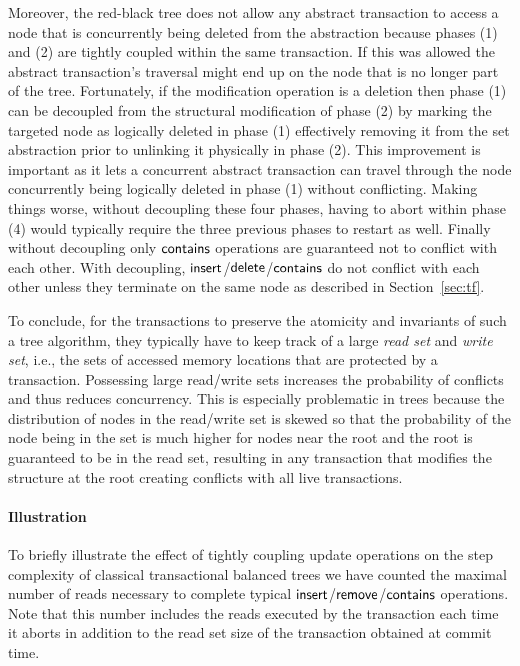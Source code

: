 Moreover, the red-black tree does not allow any abstract transaction to access a node that is concurrently being deleted from the abstraction because
phases (1) and (2) are tightly coupled within the same transaction.
If this was allowed the abstract transaction's traversal might end up on the node that is no longer part of the tree.
Fortunately, if the modification operation is a deletion then phase (1) can be decoupled from the structural modification of phase (2)
by marking the targeted node as logically deleted in phase (1) effectively removing it from the set abstraction prior to unlinking it physically in phase (2).
This improvement is important as it lets a concurrent abstract transaction can travel through the node concurrently being logically deleted in phase (1) without conflicting.
Making things worse, without decoupling these four phases, having to abort within phase (4) would typically require the three previous phases 
to restart as well. 
Finally without decoupling only $\act{contains}$ operations are guaranteed not to conflict with each other.
With decoupling, $\act{insert}$/$\act{delete}$/$\act{contains}$ do not conflict with each other unless they terminate on the same node as described in Section~\ref{sec:tf}.

To conclude, for the transactions to preserve the atomicity and invariants of such a tree algorithm, they typically have to 
keep track of a large \emph{read set} and \emph{write set}, 
i.e., the sets of accessed memory locations that are protected by a transaction. 
Possessing large read/write sets increases the probability of conflicts and thus reduces concurrency.
This is especially problematic
in trees because the distribution of nodes in the read/write set is skewed so that the
probability of the node being in the set is much higher for nodes near the root and the root is guaranteed to be in the read set,
resulting in any transaction that modifies the structure at the root creating conflicts with all live transactions.

\paragraph{Illustration}

To briefly illustrate the effect of tightly coupling update operations on the step complexity of classical transactional balanced trees
we have counted the maximal number of reads necessary to complete typical $\lit{insert}$/$\lit{remove}$/$\lit{contains}$ operations.
Note that this number includes the reads executed by the transaction each time it aborts in addition to the read set size of the transaction obtained at commit time.

